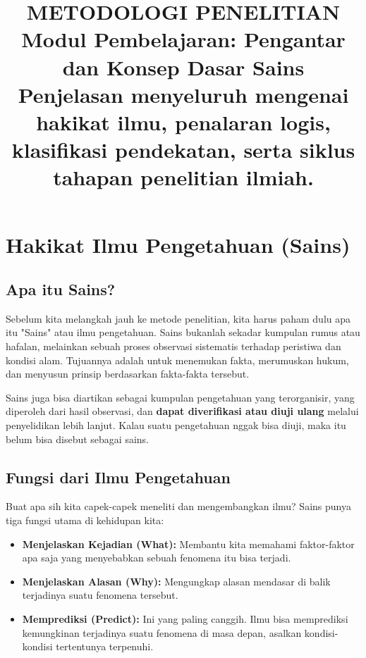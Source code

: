 \documentclass[12pt,a4paper]{article}
\title{
  {\LARGE\bfseries METODOLOGI PENELITIAN}\\[0.5em]
  {\large Modul Pembelajaran: Pengantar dan Konsep Dasar Sains}\\[0.8em]
  {\normalsize Penjelasan menyeluruh mengenai hakikat ilmu, penalaran logis, klasifikasi pendekatan, serta siklus tahapan penelitian ilmiah.}
}
\author{}
\date{}
\begin{document}
\maketitle
\thispagestyle{fancy}
\tableofcontents
\newpage


\section{Hakikat Ilmu Pengetahuan (Sains)}

\subsection{Apa itu Sains?}
Sebelum kita melangkah jauh ke metode penelitian, kita harus paham dulu apa itu "Sains" atau ilmu pengetahuan. Sains bukanlah sekadar kumpulan rumus atau hafalan, melainkan sebuah proses observasi sistematis terhadap peristiwa dan kondisi alam. Tujuannya adalah untuk menemukan fakta, merumuskan hukum, dan menyusun prinsip berdasarkan fakta-fakta tersebut.

Sains juga bisa diartikan sebagai kumpulan pengetahuan yang terorganisir, yang diperoleh dari hasil observasi, dan \textbf{dapat diverifikasi atau diuji ulang} melalui penyelidikan lebih lanjut. Kalau suatu pengetahuan nggak bisa diuji, maka itu belum bisa disebut sebagai sains.

\subsection{Fungsi dari Ilmu Pengetahuan}
Buat apa sih kita capek-capek meneliti dan mengembangkan ilmu? Sains punya tiga fungsi utama di kehidupan kita:
\begin{itemize}
    \item \textbf{Menjelaskan Kejadian (What):} Membantu kita memahami faktor-faktor apa saja yang menyebabkan sebuah fenomena itu bisa terjadi.
    \item \textbf{Menjelaskan Alasan (Why):} Mengungkap alasan mendasar di balik terjadinya suatu fenomena tersebut.
    \item \textbf{Memprediksi (Predict):} Ini yang paling canggih. Ilmu bisa memprediksi kemungkinan terjadinya suatu fenomena di masa depan, asalkan kondisi-kondisi tertentunya terpenuhi.
\end{itemize}
\end{document}
